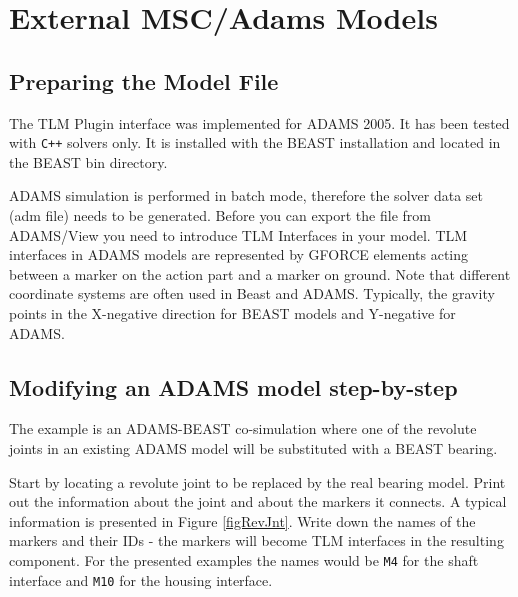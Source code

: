 \chapter{External MSC/Adams Models}
\section{Preparing the Model File}
\label{secPrepareADAMS}
The TLM Plugin interface was implemented for ADAMS 2005. It has been
tested with \verb!C++! solvers only. It is installed with the BEAST
installation and located in the BEAST bin directory.

ADAMS simulation is performed in batch mode, therefore the solver
data set (adm file) needs to be generated.
Before you can export the file from ADAMS/View you need to
introduce TLM Interfaces in your model. TLM interfaces in ADAMS
models are represented by GFORCE elements acting between a
marker on the action part and a marker on ground. Note that
different coordinate systems are often used in Beast and ADAMS.
Typically, the gravity points in the X-negative direction
for BEAST models and Y-negative for ADAMS.

\section{Modifying an ADAMS model step-by-step}
\label{secADAMSsteps}
The example is an ADAMS-BEAST co-simulation where one of the revolute
joints in an existing ADAMS model will be substituted with a BEAST
bearing.

Start by locating a revolute joint to be replaced by
the real bearing model. Print out the information
about the joint and about the markers it connects.
A typical information is presented in Figure \ref{figRevJnt}.
Write down the names of the markers and their IDs -
the markers will become TLM interfaces in the
resulting component. For the presented examples
the names would be {\tt M4} for the shaft interface
and {\tt M10} for the housing interface.

